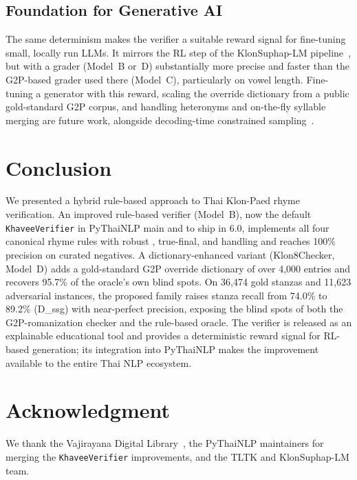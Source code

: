 \documentclass[conference]{IEEEtran}
\begin{document}
\subsection{Foundation for Generative AI}

The same determinism makes the verifier a suitable reward signal for
fine-tuning small, locally run LLMs. It mirrors the RL step of the
KlonSuphap-LM pipeline~\cite{klonsuphap}, but with a grader (Model~B or~D)
substantially more precise and faster than the G2P-based grader used there
(Model~C), particularly on vowel length. Fine-tuning a generator with this
reward, scaling the override dictionary from a public gold-standard G2P
corpus, and handling heteronyms and on-the-fly syllable merging are future
work, alongside decoding-time constrained sampling~\cite{geng2023}.


\section{Conclusion}

We presented a hybrid rule-based approach to Thai Klon-Paed rhyme
verification. An improved rule-based verifier (Model~B), now the default
\texttt{KhaveeVerifier} in PyThaiNLP main and to ship in 6.0, implements all four canonical
rhyme rules with robust , true-final, and  handling and reaches
100\% precision on curated negatives. A dictionary-enhanced variant
(Klon8Checker, Model~D) adds a gold-standard G2P override dictionary of over
4{,}000 entries and recovers 95.7\% of the oracle's own blind spots. On
36{,}474 gold stanzas and 11{,}623 adversarial instances, the proposed
family raises stanza recall from 74.0\% to 89.2\% (D\_ssg) with
near-perfect precision, exposing the blind spots of both the
G2P-romanization checker and the rule-based oracle. The verifier is
released as an explainable educational tool and provides a deterministic
reward signal for RL-based generation; its integration into PyThaiNLP
makes the improvement available to the entire Thai NLP ecosystem.

\section*{Acknowledgment}
We thank the Vajirayana Digital Library~\cite{vajirayana}, the PyThaiNLP
maintainers for merging the \texttt{KhaveeVerifier} improvements, and the
TLTK and KlonSuphap-LM team.
\end{document}
